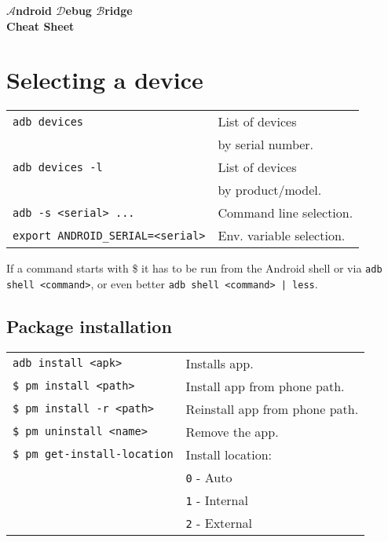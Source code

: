 \documentclass[11pt,landscape,a4paper]{article}
\begin{document}
\raggedright
\footnotesize
\begin{multicols}{3}


\setlength{\premulticols}{1pt}
\setlength{\postmulticols}{1pt}
\setlength{\multicolsep}{1pt}
\setlength{\columnsep}{2pt}

\begin{center}
     \Large{\textbf{$\mathcal{A}$ndroid $\mathcal{D}$ebug $\mathcal{B}$ridge\\ Cheat Sheet}} \\
\end{center}

\section{Selecting a device}
\begin{tabular}{@{}ll@{}}
\verb!adb devices!    & List of devices \\
& \hspace*{3mm} by serial number. \\
\verb!adb devices -l!    & List of devices\\
&  \hspace*{3mm} by product/model. \\
\verb!adb -s <serial> ...!  & Command line selection. \\
\verb!export ANDROID_SERIAL=<serial>! & Env. variable selection. \\
\end{tabular}

\vspace*{2mm}

If a command starts with \$ it has to be run from the Android shell or via \verb!adb shell <command>!, or even better \verb!adb shell <command> | less!.

\subsection{Package installation}
\newlength{\MyLen}
\begin{tabular}{@{}ll@{}}
\texttt{adb install <apk>} & Installs app. \\
\texttt{\$ pm install <path>}  &  Install app from phone path. \\
\texttt{\$ pm install -r <path>}  &  Reinstall app from phone path. \\
\texttt{\$ pm uninstall <name>}   & Remove the app. \\
\texttt{\$ pm get-install-location}  &  Install location:\\
& \texttt{0} - Auto \\
& \texttt{1} - Internal \\
& \texttt{2} - External \\
\end{tabular}



\end{multicols}
\end{document}

